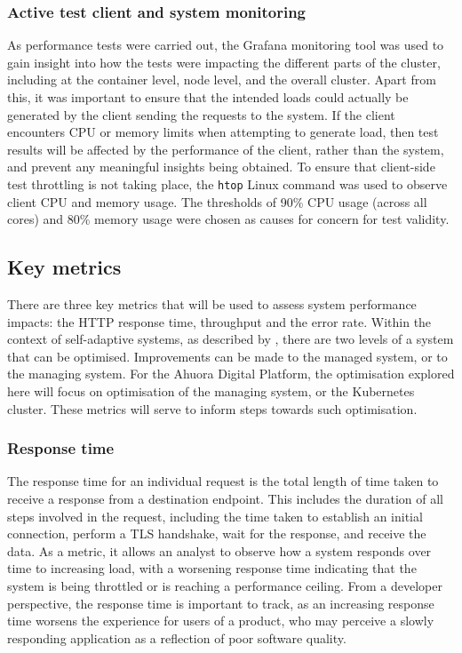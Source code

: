 \subsubsection{Active test client and system monitoring}

As performance tests were carried out, the Grafana monitoring tool was used to gain insight into how the tests were impacting the different parts of the cluster, including at the container level, node level, and the overall cluster. Apart from this, it was important to ensure that the intended loads could actually be generated by the client sending the requests to the system. If the client encounters CPU or memory limits when attempting to generate load, then test results will be affected by the performance of the client, rather than the system, and prevent any meaningful insights being obtained. To ensure that client-side test throttling is not taking place, the \verb|htop| Linux command was used to observe client CPU and memory usage. The thresholds of 90\% CPU usage (across all cores) and 80\% memory usage were chosen as causes for concern for test validity.

\subsection{Key metrics}

There are three key metrics that will be used to assess system performance impacts: the HTTP response time, throughput and the error rate. Within the context of self-adaptive systems, as described by \citeauthor{weyns_engineering_2018} \cite{weyns_engineering_2018}, there are two levels of a system that can be optimised. Improvements can be made to the managed system, or to the managing system. For the Ahuora Digital Platform, the optimisation explored here will focus on optimisation of the managing system, or the Kubernetes cluster. These metrics will serve to inform steps towards such optimisation.

\subsubsection{Response time}

The response time for an individual request is the total length of time taken to receive a response from a destination endpoint. This includes the duration of all steps involved in the request, including the time taken to establish an initial connection, perform a TLS handshake, wait for the response, and receive the data. As a metric, it allows an analyst to observe how a system responds over time to increasing load, with a worsening response time indicating that the system is being throttled or is reaching a performance ceiling. From a developer perspective, the response time is important to track, as an increasing response time worsens the experience for users of a product, who may perceive a slowly responding application as a reflection of poor software quality.

